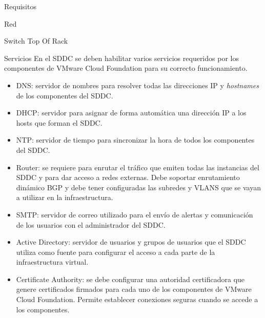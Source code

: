 \begin{section}{Requisitos}
\begin{subsection}{Red}
\begin{subsubsection}{Switch Top Of Rack}
 \end{subsubsection}
 \begin{subsubsection}{Servicios}
     En el SDDC se deben habilitar varios servicios requeridos por los componentes de VMware Cloud Foundation para su correcto funcionamiento.
     \begin{itemize}
         \item DNS: servidor de nombres para resolver todas las direcciones IP y \textit{hostnames} de los componentes del SDDC.
         \item DHCP: servidor para asignar de forma automática una dirección IP a los hosts que forman el SDDC.
         \item NTP: servidor de tiempo para sincronizar la hora de todos los componentes del SDDC.
         \item Router: se requiere para enrutar el tráfico que emiten todas las instancias del SDDC y para dar acceso a redes externas. Debe soportar enrutamiento dinámico BGP y debe tener configuradas las subredes y VLANS que se vayan a utilizar en la infraestructura.
         \item SMTP: servidor de correo utilizado para el envío de alertas y comunicación de los usuarios con el administrador del SDDC.
         \item Active Directory: servidor de usuarios y grupos de usuarios que el SDDC utiliza como fuente para configurar el acceso a cada parte de la infraestructura virtual.
         \item Certificate Authority: se debe configurar una autoridad certificadora que genere certificados firmados para cada uno de los componentes de VMware Cloud Foundation. Permite establecer conexiones seguras cuando se accede a los componentes.
     \end{itemize}
 \end{subsubsection}
\end{subsection}
\end{section}


